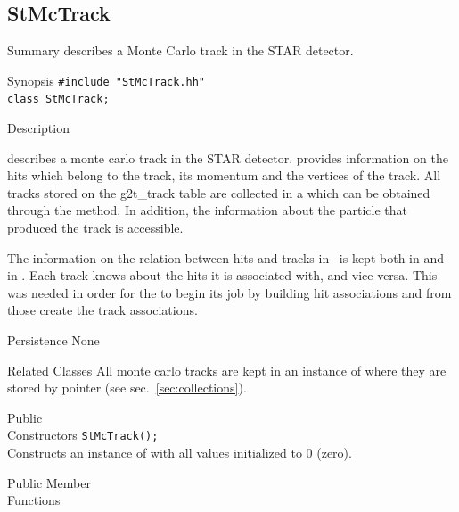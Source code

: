 \subsection{StMcTrack}
\label{sec:StMcTrack}
\begin{Entry}
\item[Summary]
     describes a Monte Carlo track in the STAR detector.

\item[Synopsis]
    \verb+#include "StMcTrack.hh"+\\
    \verb+class StMcTrack;+\\

\item[Description]
    
     describes a monte carlo track in the STAR
    detector.  
     provides information on the
    hits which belong to the track, its momentum and the
    vertices of the track.  All
    tracks stored on the g2t\_track table are collected in a
     which can be obtained through the
     method.
    In addition, the information about the particle that produced
    the track is accessible.
    
    The information on the relation between hits and tracks in
    \StMcEvent\ is kept both in  and in .
    Each track knows about the hits it is associated with, and vice versa.
    This was needed in order for the \StAssociationMaker to begin its job by
    building hit associations and from those create the track associations.
    
\item[Persistence]
    None

\item[Related Classes]
    All monte carlo tracks are kept in an instance of 
    where they are stored by pointer (see sec.~\ref{sec:collections}).

\item[Public\\ Constructors]
    \verb+StMcTrack();+\\
    Constructs an instance of  with all values initialized to 0 (zero).

\item[Public Member\\ Functions]


\end{Entry}
